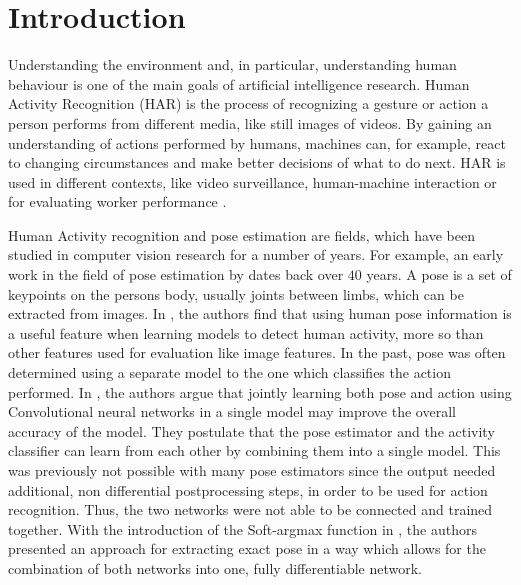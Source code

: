 \chapter{Introduction}



Understanding the environment and, in particular, understanding human behaviour is one of the main goals of artificial intelligence research.
Human Activity Recognition (HAR) is the process of recognizing a gesture or action a person performs from different media, like still images of videos.
By gaining an understanding of actions performed by humans, machines can, for example, react to changing circumstances and make better decisions of what to do next.
HAR is used in different contexts, like video surveillance, human-machine interaction or
for evaluating worker performance \cite{reining_towards_2018}.

Human Activity recognition and pose estimation are fields, which have been studied in computer vision research for a number of years.
For example, an early work in the field of pose estimation by \cite{fischler_representation_1973} dates back over $40$ years.
A pose is a set of keypoints on the persons body, usually joints between limbs, which can be extracted from images.
In \cite{jhuang_towards_2013}, the authors find that using human pose information is a useful feature when learning models to detect human activity, more so than other features used for evaluation like image features.
In the past, pose was often determined using a separate model to the one which classifies the action performed.
In \cite{luvizon_2d/3d_2018}, the authors argue that jointly learning both pose and action using Convolutional neural networks in a single model may improve the overall accuracy of the model.
They postulate that the pose estimator and the activity classifier can learn from each other by combining them into a single model.
This was previously not possible with many pose estimators since the output needed additional, non differential postprocessing steps, in order to be used for action recognition.
Thus, the two networks were not able to be connected and trained together.
With the introduction of the Soft-argmax function in \cite{luvizon_human_2017}, the authors presented an approach for extracting exact pose in a way which allows for the combination of both networks into one, fully differentiable network.


